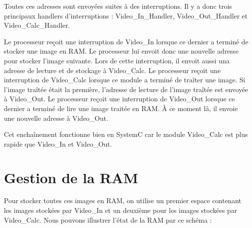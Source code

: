 \documentclass[a4paper,12pt]{report}
\begin{document}
{{{                                                 Toutes ces adresses sont envoyées suites à des interruptions.
                                                 Il y a donc trois principaux handlers d'interruptions : Video\_In\_Handler, Video\_Out\_Handler et Video\_Calc\_Handler.

                                                 Le processeur reçoit une interruption de Video\_In lorsque ce dernier a terminé de stocker une image en RAM. Le processeur lui envoit donc une nouvelle adresse pour stocker l'image suivante. Lors de cette interruption, il envoit aussi una adresse de lecture et de stockage à Video\_Calc.
                                                 Le processeur reçoit une interruption de Video\_Calc lorsque ce module a terminé de traîter une image. Si l'image traîtée était la première, l'adresse de lecture de l'image traîtée est envoyée à Video\_Out.
                                                 Le processeur reçoit une interruption de Video\_Out lorsque ce dernier a terminé de lire une image traitée en RAM. À ce moment là, il envoie une nouvelle adresse à Video\_Out.

                                                 Cet enchaînement fonctionne bien en SystemC car le module Video\_Calc est plus rapide que Video\_In et Video\_Out.

                                               }
			                       \section{Gestion de la RAM}
                                                               {
	                                                         Pour stocker toutes ces images en RAM, on utilise un premier espace contenant les images stockées par Video\_In et un deuxième pour les images stockées par Video\_Calc. Nous pouvons illustrer l'état de la RAM par ce schéma :

}}}
\end{document}
